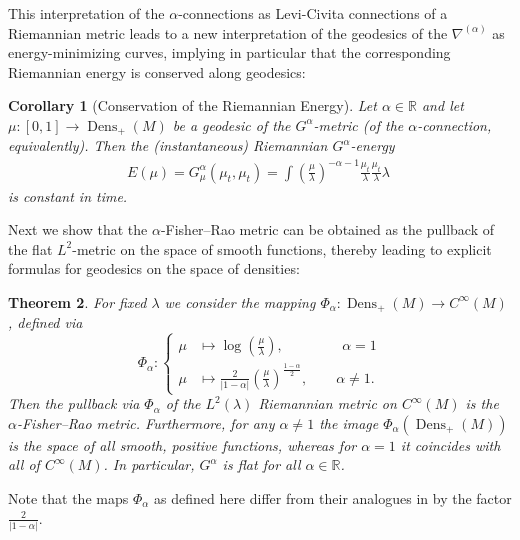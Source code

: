 \documentclass[11pt,reqno]{amsart}
\newtheorem{theorem}{Theorem}[section]
\newtheorem{corollary}[theorem]{Corollary}
\theoremstyle{definition}
\newcommand{\dx}{\lambda}
\newcommand{\Dens}{\operatorname{Dens}_+(M)}
\begin{document}
This interpretation of the $\alpha$-connections as Levi-Civita connections of a Riemannian metric leads to a new interpretation of the geodesics of the $\nabla^{(\alpha)}$ as energy-minimizing curves, implying in particular that the corresponding Riemannian energy is conserved along geodesics:
\begin{corollary}[Conservation of the Riemannian Energy]
Let $\alpha\in \mathbb R$ and let $\mu:[0,1]\to \Dens$ be a geodesic of the $G^{\alpha}$-metric (of the $\alpha$-connection, equivalently). %
Then the (instantaneous) Riemannian $G^{\alpha}$-energy
\begin{align*}
E(\mu)=G^{\alpha}_{\mu}(\mu_t,\mu_t)=
\int \left(\frac{\mu}{\dx}\right)^{-\alpha-1} \frac{\mu_t}{\dx}\frac{\mu_t}{\dx}\dx\
\end{align*}
is constant in time. 
\end{corollary}
Next we show that the $\alpha$-Fisher--Rao metric can be obtained as the pullback of the flat $L^2$-metric on the space of smooth functions, thereby leading to explicit formulas for geodesics on the space of densities:

\begin{theorem}\label{thm:explicit_dens}
For fixed $\dx$ we consider the mapping $\Phi_{\alpha}: 
\Dens \to C^{\infty}(M)$, defined via 
\begin{equation}\label{eq:Phi}
\Phi_{\alpha}: \begin{cases}
\mu &\mapsto \log\left(\frac{\mu}{\dx}\right), \qquad\qquad\,\alpha = 1\\
\mu &\mapsto \frac{2}{|1-\alpha|}\left(\frac{\mu}{\dx}\right)^{\tfrac{1-\alpha}2}, \qquad \alpha \neq 1.
\end{cases}
\end{equation}
Then the pullback via $\Phi_{\alpha}$  of the $L^2(\dx)$ Riemannian metric on $C^{\infty}(M)$ is the $\alpha$-Fisher--Rao metric. Furthermore, for any $\alpha\neq 1$ the image $\Phi_{\alpha}(\Dens)$ is the space of all smooth, positive functions, whereas for $\alpha=1$ it coincides with all of $C^{\infty}(M)$.
In particular, $G^\alpha$ is flat for all $\alpha\in \mathbb{R}$.
\end{theorem}
Note that the maps  $\Phi_\alpha$ as defined here differ from their analogues in \cite{bauer2024p} by the factor $\frac{2}{|1-\alpha|}$.
\end{document}
